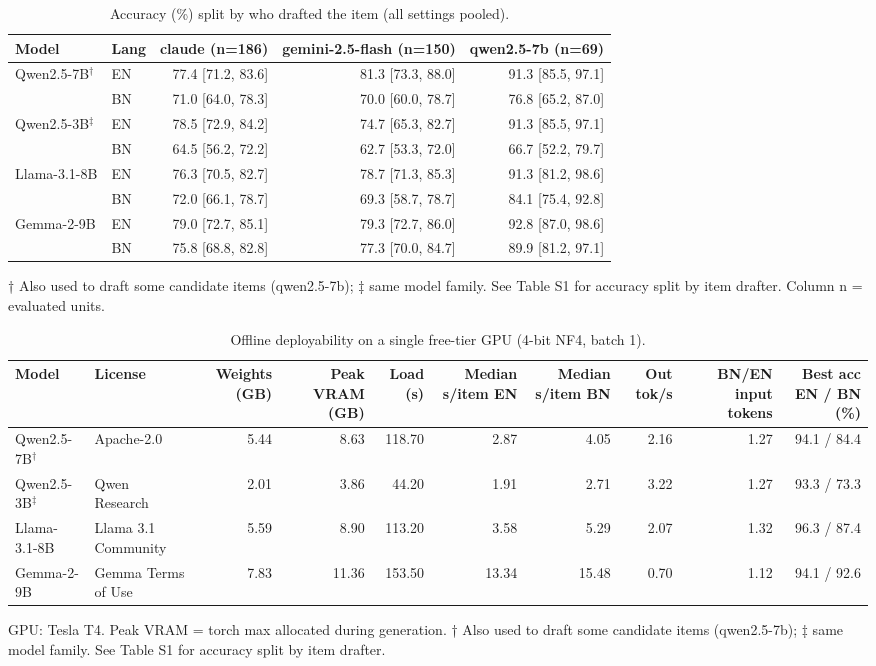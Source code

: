 \begin{table}[t]
\centering
\footnotesize
\caption{Accuracy (\%) split by who drafted the item (all settings pooled).}
\label{tab:draft}
\begin{tabular}{llrrr}
\toprule
Model & Lang & claude (n=186) & gemini-2.5-flash (n=150) & qwen2.5-7b (n=69) \\
\midrule
Qwen2.5-7B$^\dagger$ & EN & 77.4 [71.2, 83.6] & 81.3 [73.3, 88.0] & 91.3 [85.5, 97.1] \\
 & BN & 71.0 [64.0, 78.3] & 70.0 [60.0, 78.7] & 76.8 [65.2, 87.0] \\
\addlinespace
Qwen2.5-3B$^\ddagger$ & EN & 78.5 [72.9, 84.2] & 74.7 [65.3, 82.7] & 91.3 [85.5, 97.1] \\
 & BN & 64.5 [56.2, 72.2] & 62.7 [53.3, 72.0] & 66.7 [52.2, 79.7] \\
\addlinespace
Llama-3.1-8B & EN & 76.3 [70.5, 82.7] & 78.7 [71.3, 85.3] & 91.3 [81.2, 98.6] \\
 & BN & 72.0 [66.1, 78.7] & 69.3 [58.7, 78.7] & 84.1 [75.4, 92.8] \\
\addlinespace
Gemma-2-9B & EN & 79.0 [72.7, 85.1] & 79.3 [72.7, 86.0] & 92.8 [87.0, 98.6] \\
 & BN & 75.8 [68.8, 82.8] & 77.3 [70.0, 84.7] & 89.9 [81.2, 97.1] \\
\bottomrule
\end{tabular}
\par\smallskip\parbox{\linewidth}{\scriptsize † Also used to draft some candidate items (qwen2.5-7b); ‡ same model family. See Table S1 for accuracy split by item drafter. Column n = evaluated units.}
\end{table}

\begin{table}[t]
\centering
\footnotesize
\caption{Offline deployability on a single free-tier GPU (4-bit NF4, batch 1).}
\label{tab:deploy}
\begin{tabular}{llrrrrrrrr}
\toprule
Model & License & Weights (GB) & Peak VRAM (GB) & Load (s) & Median s/item EN & Median s/item BN & Out tok/s & BN/EN input tokens & Best acc EN / BN (\%) \\
\midrule
Qwen2.5-7B$^\dagger$ & Apache-2.0 & 5.44 & 8.63 & 118.70 & 2.87 & 4.05 & 2.16 & 1.27 & 94.1 / 84.4 \\
\addlinespace
Qwen2.5-3B$^\ddagger$ & Qwen Research & 2.01 & 3.86 & 44.20 & 1.91 & 2.71 & 3.22 & 1.27 & 93.3 / 73.3 \\
\addlinespace
Llama-3.1-8B & Llama 3.1 Community & 5.59 & 8.90 & 113.20 & 3.58 & 5.29 & 2.07 & 1.32 & 96.3 / 87.4 \\
\addlinespace
Gemma-2-9B & Gemma Terms of Use & 7.83 & 11.36 & 153.50 & 13.34 & 15.48 & 0.70 & 1.12 & 94.1 / 92.6 \\
\bottomrule
\end{tabular}
\par\smallskip\parbox{\linewidth}{\scriptsize GPU: Tesla T4. Peak VRAM = torch max allocated during generation. † Also used to draft some candidate items (qwen2.5-7b); ‡ same model family. See Table S1 for accuracy split by item drafter.}
\end{table}

